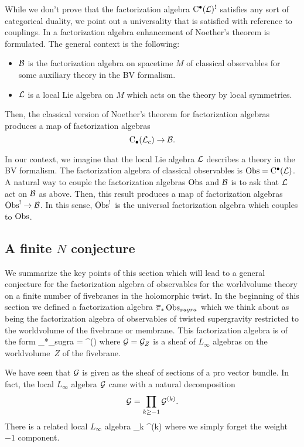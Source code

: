 While we don't prove that the factorization algebra ${\rm C}^\bullet(\mathcal L)^!$ satisfies any sort of categorical duality, we point out a universality that is satisfied with reference to couplings.
In \cite[Part 3]{CG2} a factorization algebra enhancement of Noether's theorem is formulated. 
The general context is the following: 
\begin{itemize}
\item $\mathcal B$ is the factorization algebra on spacetime $M$ of classical observables for some auxiliary theory in the BV formalism.
\item $\mathcal L$ is a local Lie algebra on $M$ which acts on the theory by local symmetries. 
\end{itemize}
Then, the classical version of Noether's theorem for factorization algebras produces a map of factorization algebras 
\[
{\rm C}_\bullet(\mathcal L_c) \to \mathcal B .
\]

In our context, we imagine that the local Lie algebra $\mathcal L$ describes a theory in the BV formalism.
The factorization algebra of classical observables is $\operatorname{Obs} = {\rm C}^\bullet(\mathcal L)$. 
A natural way to couple the factorization algebras $\operatorname{Obs}$ and $\mathcal B$ is to ask that $\mathcal L$ act on $\mathcal B$ as above.
Then, this result produces a map of factorization algebras $\operatorname{Obs}^! \to \mathcal B$.
In this sense, $\operatorname{Obs}^!$ is the universal factorization algebra which couples to $\operatorname{Obs}$.

\subsection{A finite $N$ conjecture}
\label{sec:factsummary}

We summarize the key points of this section which will lead to a general conjecture for the factorization algebra of observables for the worldvolume theory on a finite number of fivebranes in the holomorphic twist.
In the beginning of this section we defined a factorization algebra $\overline{\pi}_*\operatorname{Obs}_{sugra}$ which we think about as being the factorization algebra of observables of twisted supergravity restricted to the worldvolume of the fivebrane or membrane.
This factorization algebra is of the form 
\beqn
\label{eqn:factgrad}
\Bar{\pi}_*\Obs_{sugra} = \clie^\bu(\cG)
\eeqn
where $\mathcal G = \mathcal G_Z$ is a sheaf of $L_\infty$ algebras on the worldvolume~$Z$ of the fivebrane.

We have seen that $\mathcal G$ is given as the sheaf of sections of a pro vector bundle. 
In fact, the local $L_\infty$ algebra $\mathcal G$ came with a natural decomposition 
\[
\mathcal G = \prod_{k \geq -1} \mathcal G^{(k)} .
\]
There is a related local $L_\infty$ algebra 
\beqn
\til \cG {} \prod_{k } \cG^{(k)}
\eeqn
where we simply forget the weight $-1$ component. 

